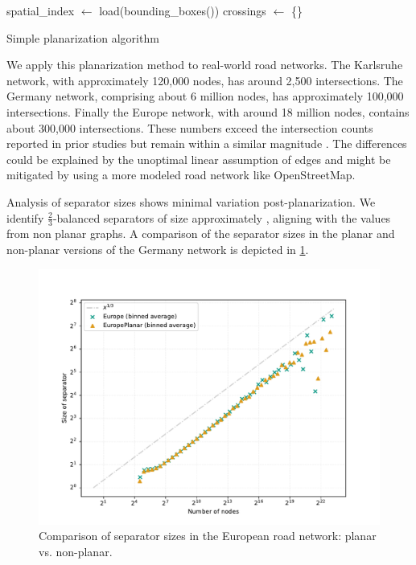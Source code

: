 \begin{algorithm}[b]
	\BlankLine
	spatial\_index \(\longleftarrow\) load(bounding\_boxes(\E))\;
	crossings \(\longleftarrow\) \{\}\;
	\caption{Simple planarization algorithm \label{alg:planarization}}
\end{algorithm}

We apply this planarization method to real-world road networks.
The Karlsruhe network, with approximately 120,000 nodes, has around 2,500 intersections.
The Germany network, comprising about 6 million nodes, has approximately 100,000 intersections.
Finally the Europe network, with around 18 million nodes, contains about 300,000 intersections.
These numbers exceed the  intersection counts reported
in prior studies but remain within a similar magnitude
\cite{eppstein_studying_2008}. The differences could be explained by the
unoptimal linear assumption of edges and might be mitigated by using a more
modeled road network like OpenStreetMap.

Analysis of separator sizes shows minimal variation post-planarization. We
identify \(\frac{2}{3}\)-balanced separators of size approximately
, aligning with the values from non planar graphs. A comparison of
the separator sizes in the planar and non-planar versions of the Germany
network is depicted in \cref{fig:germany_planar_vs_non_planar}.

\begin{figure}[tbhp]
	\centering
	\includegraphics[width=0.8\linewidth]{graphics/EuropePlanarVsNonPlanar.pdf}
	\caption{Comparison of separator sizes in the European road network: planar vs. non-planar.}
	\label{fig:germany_planar_vs_non_planar}
\end{figure}

